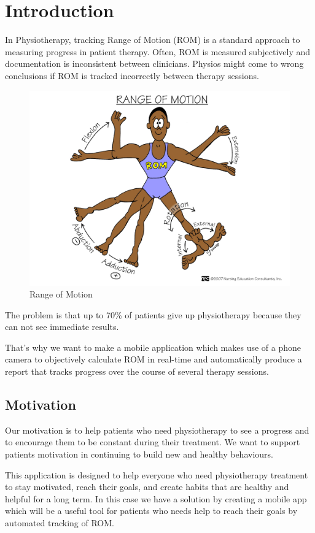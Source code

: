 \documentclass[runningheads,a4paper,11pt]{report}
\begin{document}
\newpage


\chapter{Introduction}
\par In Physiotherapy, tracking Range of Motion (ROM) is a standard approach to measuring progress in patient therapy. Often, ROM is measured subjectively and documentation is inconsistent between clinicians. Physios might come to wrong conclusions if ROM is tracked incorrectly between therapy sessions.

\begin{figure}[htbp]
	\centerline{\includegraphics[scale=0.25]{fig/rangeofmotion.png}}  
	\caption{Range of Motion}
\end{figure}

\par The problem is that up to 70\% of patients give up physiotherapy because they can not see immediate results.
\par That's why we want to make a mobile application which makes use of a phone camera to objectively calculate ROM in real-time and automatically produce a report that tracks progress over the course of several therapy sessions.

\section{Motivation}
\par Our motivation is to help patients who need physiotherapy to see a progress and to encourage them to be constant during their treatment. We want to support patients motivation in continuing to build new and healthy behaviours. 
\par This application is designed to help everyone who need physiotherapy treatment to stay motivated, reach their goals, and create habits that are healthy and helpful for a long term. In this case we have a solution by creating a mobile app which will be a useful tool for patients who needs help to reach their goals by automated tracking of ROM.
\end{document}
